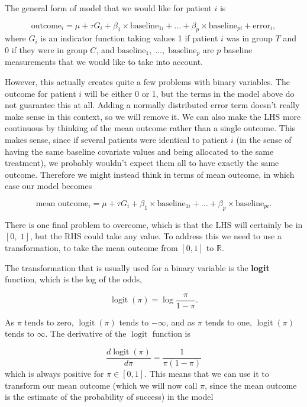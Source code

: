 \documentclass[
  openany]{book}
\theoremstyle{definition}
\theoremstyle{definition}
\theoremstyle{definition}
\theoremstyle{definition}
\theoremstyle{remark}
\begin{document}
The general form of model that we would like for patient \(i\) is

\[\text{outcome}_i = \mu + \tau G_i + \beta_1\times{\text{baseline}_{1i}} + \ldots + \beta_p\times{\text{baseline}_{pi}} + \text{error}_i,\]
where \(G_i\) is an indicator function taking values 1 if patient \(i\) was in group \(T\) and 0 if they were in group \(C\), and \(\text{baseline}_1,\;\ldots,\;\text{baseline}_p\) are \(p\) baseline measurements that we would like to take into account.

However, this actually creates quite a few problems with binary variables. The outcome for patient \(i\) will be either 0 or 1, but the terms in the model above do not guarantee this at all. Adding a normally distributed error term doesn't really make sense in this context, so we will remove it. We can also make the LHS more continuous by thinking of the mean outcome rather than a single outcome. This makes sense, since if several patients were identical to patient \(i\) (in the sense of having the same baseline covariate values and being allocated to the same treatment), we probably wouldn't expect them all to have exactly the same outcome. Therefore we might instead think in terms of mean outcome, in which case our model becomes

\[\text{mean outcome}_i = \mu + \tau G_i + \beta_1\times{\text{baseline}_{1i}} + \ldots + \beta_p\times{\text{baseline}_{pi}}.\]

There is one final problem to overcome, which is that the LHS will certainly be in \(\left[0,\;1\right]\), but the RHS could take any value. To address this we need to use a transformation, to take the mean outcome from \(\left[0,1\right]\) to \(\mathbb{R}\).

The transformation that is usually used for a binary variable is the \textbf{logit} function, which is the log of the odds,

\[\operatorname{logit}\left(\pi\right) = \log\frac{\pi}{1-\pi}.\]

As \(\pi\) tends to zero, \(\operatorname{logit}\left(\pi\right)\) tends to \(-\infty\), and as \(\pi\) tends to one, \(\operatorname{logit}\left(\pi\right)\) tends to \(\infty\). The derivative of the \(\operatorname{logit}\) function is

\[ \frac{d\operatorname{logit}\left(\pi\right)}{d\pi} = \frac{1}{\pi\left(1-\pi\right)}\]
which is always positive for \(\pi\in\left[0,1\right]\). This means that we can use it to transform our mean outcome (which we will now call \(\pi\), since the mean outcome is the estimate of the probability of success) in the model
\end{document}
